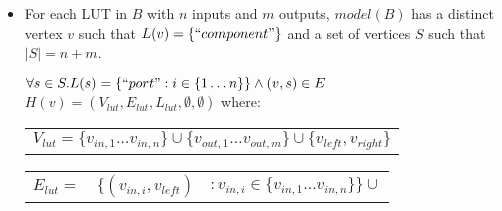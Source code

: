 \begin{defn}
\begin{itemize}
\begin{figure}
\begin{adjustbox}{width=0.7\textwidth}
\end{adjustbox}
\caption{How a 2-wire mux is represented in $model(B)$ (left) in terms of vertex $v$ with $L(v)=``component"$, port vertices and edges, and the $hierarchygraph$ $H(v)$ (right) storing the internal details of the mux. Dashed lines indicate the relation $C$ that links the vertices representing outgoing wires. Vertex labels are shown as text. See Figure \ref{fig:example:simplemux} for an example where the mux is connected to other parts.}
\label{fig:model:mux}
\end{figure}
Lastly, the relation $C$ contains a link from nodes in the FPGA $hierarchygraph$ to nodes in the mux $hierarchygraph$, i.e. $\forall s \in S . \exists w \in V_{mux} . (s, w) \in C$.
The model of a mux is illustrated in Figure \ref{fig:model:mux}.

\item For each LUT in $B$ with $n$ inputs and $m$ outputs, $model(B)$ has a distinct vertex $v$ such that $L(v)=\{``component"\}$ and a set of vertices $S$ such that $|S|=n+m$.

$\forall s \in S. L(s)=\{``port" : i \in \{1 \dots n\}\} \land (v, s) \in E$\\

$H(v) = (V_{lut}, E_{lut}, L_{lut}, \emptyset, \emptyset)$ where:

\begin{tabular}{l}
$V_{lut}=\{v_{in, 1} \dots v_{in, n}\} \cup \{v_{out, 1} \dots v_{out, m}\} \cup \{v_{left}, v_{right}\}$\\
\end{tabular}

\begin{tabular}{lll}
$E_{lut}=$&$\{(v_{in, i}, v_{left})$&$: v_{in, i} \in \{v_{in, 1} \dots v_{in, n}\}\} \cup$\\


\end{tabular}
\end{itemize}
\end{defn}
